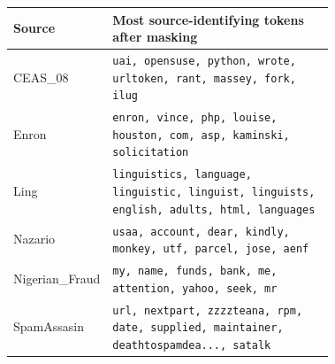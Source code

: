 \begin{tabular}{lp{0.72\linewidth}}
\toprule
Source & Most source-identifying tokens after masking \\
\midrule
CEAS\_08 & \texttt{uai, opensuse, python, wrote, urltoken, rant, massey, fork, ilug} \\
Enron & \texttt{enron, vince, php, louise, houston, com, asp, kaminski, solicitation} \\
Ling & \texttt{linguistics, language, linguistic, linguist, linguists, english, adults, html, languages} \\
Nazario & \texttt{usaa, account, dear, kindly, monkey, utf, parcel, jose, aenf} \\
Nigerian\_Fraud & \texttt{my, name, funds, bank, me, attention, yahoo, seek, mr} \\
SpamAssasin & \texttt{url, nextpart, zzzzteana, rpm, date, supplied, maintainer, deathtospamdea..., satalk} \\
\bottomrule
\end{tabular}